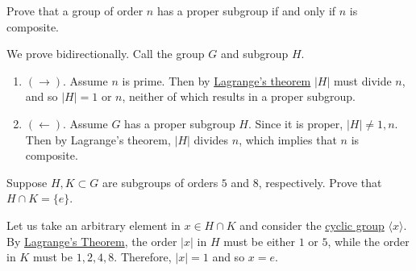   \begin{exercise}[Shifrin 6.3.11]
    Prove that a group of order $n$ has a proper subgroup if and only if $n$ is composite.
  \end{exercise}
  \begin{solution}
    We prove bidirectionally. Call the group $G$ and subgroup $H$. 
    \begin{enumerate}
      \item $(\rightarrow)$. Assume $n$ is prime. Then by \hyperref[thm:lagranges-theorem]{Lagrange's theorem} $|H|$ must divide $n$, and so $|H| = 1$ or $n$, neither of which results in a proper subgroup. 
      \item $(\leftarrow)$. Assume $G$ has a proper subgroup $H$. Since it is proper, $|H| \neq 1, n$. Then by Lagrange's theorem, $|H|$ divides $n$, which implies that $n$ is composite. 
    \end{enumerate}
  \end{solution}

  \begin{exercise}[Shifrin 6.3.13]
    Suppose $H, K \subset G$ are subgroups of orders $5$ and $8$, respectively. Prove that $H \cap K = \{e\}$.
  \end{exercise}
  \begin{solution}
    Let us take an arbitrary element in $x \in H \cap K$ and consider the \hyperref[def:cyclic-group]{cyclic group} $\langle x \rangle$. By \hyperref[thm:lagranges-theorem]{Lagrange's Theorem}, the order $|x|$ in $H$ must be either $1$ or $5$, while the order in $K$ must be $1, 2, 4, 8$. Therefore, $|x| = 1$ and so $x = e$. 
  \end{solution}

